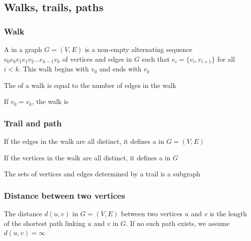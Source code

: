 \documentclass[aspectratio=43]{beamer}
\begin{document}



\subsection{Walks, trails, paths}


\begin{frame}\frametitle{Walk}
\begin{definition}[{Walk}]
A  in a graph $G=(V,E)$ is a non-empty alternating sequence $v_0 e_0 v_1 e_1 v_2 \dots e_{k-1} v_k$ of vertices and edges in $G$ such that $e_i=\{v_i, v_{i+1}\}$ for all $i<k$. 
This walk begins with $v_0$ and ends with $v_k$
\end{definition}
\vfill
\begin{definition}
The  of a walk is equal to the number of edges in the walk
\end{definition}
\vfill
\begin{definition}
If $v_0=v_k$, the walk is 
\end{definition}
\end{frame}


\begin{frame}\frametitle{Trail and path}
\begin{definition}[{Trail}]
If the edges in the walk are all distinct, it defines a  in $G=(V,E)$
\end{definition}
\vfill
\begin{definition}[{Path}]
If the vertices in the walk are all distinct, it defines a  in $G$
\end{definition}
\vfill
The sets of vertices and edges determined by a trail is a subgraph
\end{frame}


\begin{frame}\frametitle{Distance between two vertices}
\begin{definition}
The distance $d(u,v)$ in $G=(V,E)$ between two vertices $u$ and $v$ is the length of the shortest path linking $u$ and $v$ in $G$. If no such path exists, we assume $d(u,v)=\infty$
\end{definition}
\end{frame}
\end{document}

